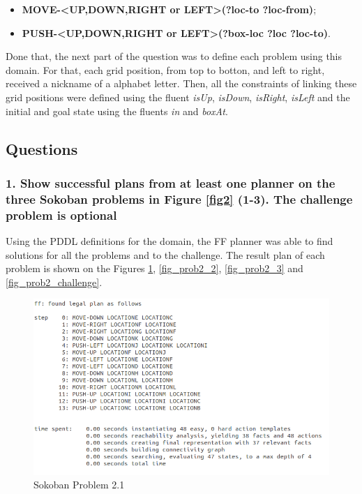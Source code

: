 \documentclass[10pt, letter]{article}
\begin{document}
\begin{itemize}
\item \textbf{MOVE-<UP,DOWN,RIGHT or LEFT>(?loc-to ?loc-from)};
\item \textbf{PUSH-<UP,DOWN,RIGHT or LEFT>(?box-loc ?loc ?loc-to)}.
\end{itemize} 

Done that, the next part of the question was to define each problem using this domain. For that, each grid position, from top to botton, and left to right, received a nickname of a alphabet letter. Then, all the constraints of linking these grid positions were defined using the fluent \textit{isUp}, \textit{isDown}, \textit{isRight}, \textit{isLeft} and the initial and goal state using the fluents \textit{in} and \textit{boxAt}.

\subsection{Questions}
\subsubsection*{1. Show successful plans from at least one planner on the three Sokoban problems in Figure \ref{fig2} (1-3). The challenge problem is optional}
Using the PDDL definitions for the domain, the FF planner was able to find solutions for all the problems and to the challenge. The result plan of each problem is shown on the Figures \ref{fig_prob2_1}, \ref{fig_prob2_2}, \ref{fig_prob2_3} and \ref{fig_prob2_challenge}.

\begin{figure}[h!]
  \centering
    \includegraphics[scale = 0.4]{images/FF_Solution_p2_1}
    \caption{Sokoban Problem 2.1}
  \label{fig_prob2_1}
\end{figure}
\end{document}
